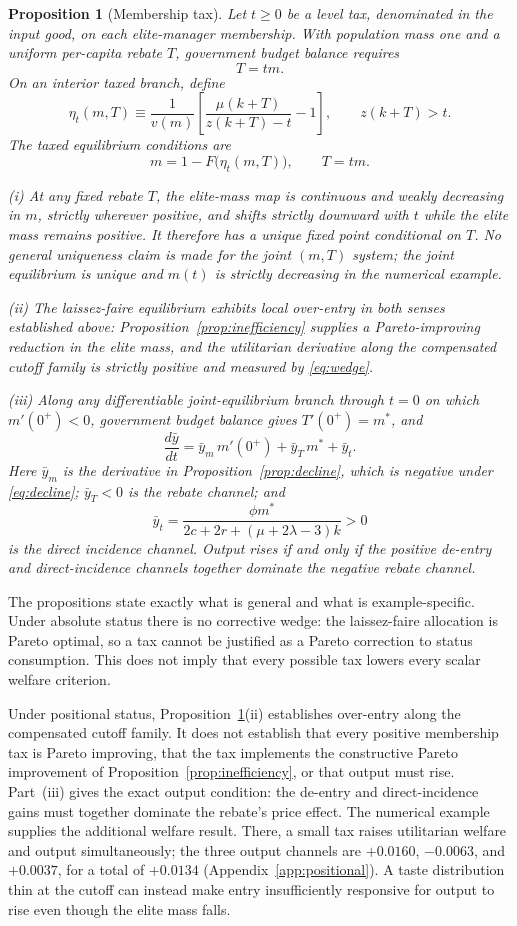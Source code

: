 \documentclass[12pt,letterpaper]{article}
\newtheorem{proposition}{Proposition}
\theoremstyle{definition}
\begin{document}
\begin{proposition}[Membership tax]\label{prop:tax}
Let $t\geq0$ be a level tax, denominated in the input good, on each elite-manager membership.
With population mass one and a uniform per-capita rebate $T$, government budget balance requires
\[
  T=tm.
\]
On an interior taxed branch, define
\[
  \eta_t(m,T)
  \equiv
  \frac{1}{v(m)}
  \left[
    \frac{\mu(k+T)}{z(k+T)-t}-1
  \right],
  \qquad z(k+T)>t.
\]
The taxed equilibrium conditions are
\[
  m=1-F\big(\eta_t(m,T)\big),
  \qquad
  T=tm.
\]

(i) At any fixed rebate $T$, the elite-mass map is continuous and weakly decreasing in $m$, strictly wherever positive, and shifts strictly downward with $t$ while the elite mass remains positive.
It therefore has a unique fixed point conditional on $T$.
No general uniqueness claim is made for the joint $(m,T)$ system; the joint equilibrium is unique and $m(t)$ is strictly decreasing in the numerical example.

(ii) The laissez-faire equilibrium exhibits local over-entry in both senses established above: Proposition~\ref{prop:inefficiency} supplies a Pareto-improving reduction in the elite mass, and the utilitarian derivative along the compensated cutoff family is strictly positive and measured by \eqref{eq:wedge}.

(iii) Along any differentiable joint-equilibrium branch through $t=0$ on which $m'(0^+)<0$, government budget balance gives $T'(0^+)=m^\ast$, and
\[
  \frac{d\bar y}{dt}
  =
  \bar y_m\,m'(0^+)
  +
  \bar y_T\,m^\ast
  +
  \bar y_t.
\]
Here $\bar y_m$ is the derivative in Proposition~\ref{prop:decline}, which is negative under \eqref{eq:decline}; $\bar y_T<0$ is the rebate channel; and
\[
  \bar y_t
  =
  \frac{\phi m^\ast}
  {2c+2r+(\mu+2\lambda-3)k}
  >0
\]
is the direct incidence channel.
Output rises if and only if the positive de-entry and direct-incidence channels together dominate the negative rebate channel.
\end{proposition}

The propositions state exactly what is general and what is example-specific.
Under absolute status there is no corrective wedge: the laissez-faire allocation is Pareto optimal, so a tax cannot be justified as a Pareto correction to status consumption.
This does not imply that every possible tax lowers every scalar welfare criterion.

Under positional status, Proposition~\ref{prop:tax}(ii) establishes over-entry along the compensated cutoff family.
It does not establish that every positive membership tax is Pareto improving, that the tax implements the constructive Pareto improvement of Proposition~\ref{prop:inefficiency}, or that output must rise.
Part~(iii) gives the exact output condition: the de-entry and direct-incidence gains must together dominate the rebate's price effect.
The numerical example supplies the additional welfare result.
There, a small tax raises utilitarian welfare and output simultaneously; the three output channels are $+0.0160$, $-0.0063$, and $+0.0037$, for a total of $+0.0134$ (Appendix~\ref{app:positional}).
A taste distribution thin at the cutoff can instead make entry insufficiently responsive for output to rise even though the elite mass falls.
\end{document}
